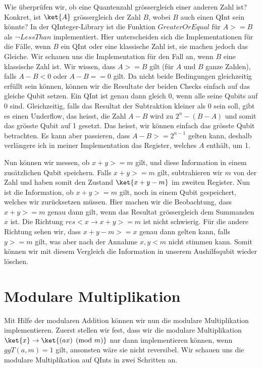 Wie überprüfen wir, ob eine Quantenzahl grössergleich einer anderen Zahl ist? Konkret, ist $\ket{A}$ grössergleich der Zahl $B$, wobei $B$ auch einen QInt sein könnte? In der QInteger-Library ist die Funktion $GreaterOrEqual$ für $A >= B$ als ¬$LessThan$ implementiert. Hier unterscheiden sich die Implementationen für die Fälle, wenn $B$ ein QInt oder eine klassische Zahl ist, sie machen jedoch das Gleiche. Wir schauen uns die Implementation für den Fall an, wenn $B$ eine klassische Zahl ist. Wir wissen, dass $A >= B$ gilt (für $A$ und $B$ ganze Zahlen), falls $A - B < 0$ oder $A - B == 0$ gilt. Da nicht beide Bedingungen gleichzeitig erfüllt sein können, können wir die Resultate der beiden Checks einfach auf das gleiche Qubit setzen. Ein QInt ist genau dann gleich 0, wenn alle seine Qubits auf 0 sind. Gleichzeitig, falls das Resultat der Subtraktion kleiner als $0$ sein soll, gibt es einen Underflow, das heisst, die Zahl $A - B$ wird zu $2^n - (B - A)$ und somit das grösste Qubit auf 1 gesetzt. Das heisst, wir können einfach das grösste Qubit betrachten. Es kann aber passieren, dass $A - B >= 2^{n - 1}$ gelten kann, deshalb verlängere ich in meiner Implementation das Register, welches $A$ enthält, um 1.



Nun können wir messen, ob $x + y >= m$ gilt, und diese Information in einem zusätzlichen Qubit speichern. Falls $x + y >= m$ gilt, subtrahieren wir $m$ von der Zahl und haben somit den Zustand $\ket{x + y - m}$ im zweiten Register. Nun ist die Information, ob $x + y >= m$ gilt, noch in einem Qubit gespeichert, welches wir zurücksetzen müssen. Hier machen wir die Beobachtung, dass $x + y >= m$ genau dann gilt, wenn das Resultat grössergleich dem Summanden $x$ ist. Die Richtung $res < x \rightarrow x + y >= m$ ist nicht schwierig. Für die andere Richtung sehen wir, dass $x + y - m >= x$ genau dann gelten kann, falls $y >= m$ gilt, was aber nach der Annahme $x, y < m$ nicht stimmen kann. Somit können wir mit diesem Vergleich die Information in unserem Aushilfsqubit wieder löschen.

\section{Modulare Multiplikation}
Mit Hilfe der modularen Addition können wir nun die modulare Multiplikation implementieren. Zuerst stellen wir fest, dass wir die modulare Multiplikation $\ket{x} \rightarrow \ket{(ax) \pmod{m}}$ nur dann implementieren können, wenn $ggT(a, m) = 1$ gilt, ansonsten wäre sie nicht reversibel. \newline
Wir schauen uns die modulare Multiplikation auf QInts in zwei Schritten an.

